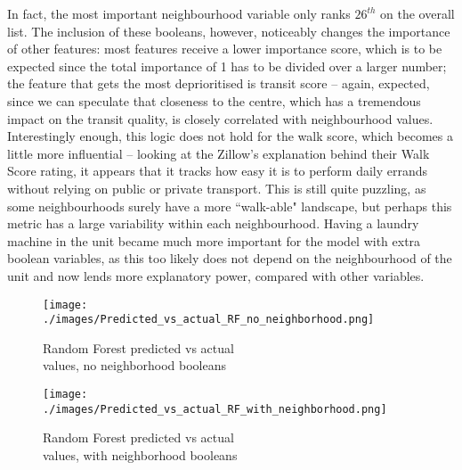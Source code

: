 \documentclass[12pt]{report}
\begin{document}
In fact, the most important neighbourhood variable only ranks $26^{th}$ on the overall list. The inclusion of these booleans, however, noticeably changes the importance of other features: most features receive a lower importance score, which is to be expected since the total importance of 1 has to be divided over a larger number; the feature that gets the most deprioritised is transit score -- again, expected, since we can speculate that closeness to the centre, which has a tremendous impact on the transit quality, is closely correlated with neighbourhood values. Interestingly enough, this logic does not hold for the walk score, which becomes a little more influential -- looking at the Zillow's explanation behind their Walk Score rating, it appears that it tracks how easy it is to perform daily errands without relying on public or private transport. This is still quite puzzling, as some neighbourhoods surely have a more ``walk-able" landscape, but perhaps this metric has a large variability within each neighbourhood. Having a laundry machine in the unit became much more important for the model with extra boolean variables, as this too likely does not depend on the neighbourhood of the unit and now lends more explanatory power, compared with other variables.

\begin{figure}[ht]
	\begin{minipage}[t]{0.47\textwidth}
		\centering
		\texttt{[image: ./images/Predicted\_vs\_actual\_RF\_no\_neighborhood.png]}
		\caption{Random Forest predicted vs actual \\ values, no neighborhood booleans}
		\label{fig:rf-scatterplot-test-no-neighborhood}
	\end{minipage}
	\begin{minipage}[t]{0.47\textwidth}
		\centering
		\texttt{[image: ./images/Predicted\_vs\_actual\_RF\_with\_neighborhood.png]}
		\caption{Random Forest predicted vs actual \\ values, with neighborhood booleans}
		\label{fig:rf-scatterplot-test}
	\end{minipage}
\end{figure}
\end{document}
